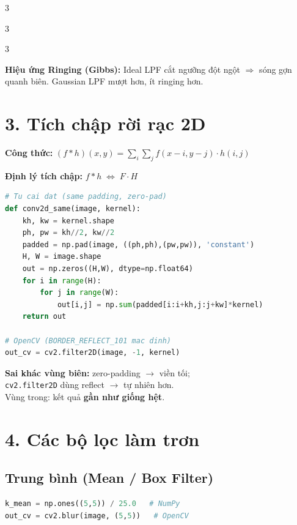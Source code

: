 \documentclass[9pt,landscape,a4paper]{extarticle}
\begin{document}
\begin{multicols*}{3}
\begin{multicols*}{3}
\begin{multicols}{3}
\begin{notebox}
\textbf{Hiệu ứng Ringing (Gibbs):} Ideal LPF cắt ngưỡng đột ngột
$\Rightarrow$ sóng gợn quanh biên. Gaussian LPF mượt hơn, ít ringing hơn.
\end{notebox}

\section{3. Tích chập rời rạc 2D}

\textbf{Công thức:}
$(f*h)(x,y) = \displaystyle\sum_{i}\sum_{j} f(x-i,y-j)\cdot h(i,j)$

\textbf{Định lý tích chập:}
$f*h \;\Longleftrightarrow\; F\cdot H$

\begin{lstlisting}[language=Python]
# Tu cai dat (same padding, zero-pad)
def conv2d_same(image, kernel):
    kh, kw = kernel.shape
    ph, pw = kh//2, kw//2
    padded = np.pad(image, ((ph,ph),(pw,pw)), 'constant')
    H, W = image.shape
    out = np.zeros((H,W), dtype=np.float64)
    for i in range(H):
        for j in range(W):
            out[i,j] = np.sum(padded[i:i+kh,j:j+kw]*kernel)
    return out

# OpenCV (BORDER_REFLECT_101 mac dinh)
out_cv = cv2.filter2D(image, -1, kernel)
\end{lstlisting}

\begin{notebox}
\textbf{Sai khác vùng biên:} zero-padding $\to$ viền tối;\\
\texttt{cv2.filter2D} dùng reflect $\to$ tự nhiên hơn.\\
Vùng trong: kết quả \textbf{gần như giống hệt}.
\end{notebox}

\section{4. Các bộ lọc làm trơn}

\subsection{Trung bình (Mean / Box Filter)}
\begin{lstlisting}[language=Python]
k_mean = np.ones((5,5)) / 25.0   # NumPy
out_cv = cv2.blur(image, (5,5))   # OpenCV
\end{lstlisting}


\end{multicols}
\end{multicols*}
\end{multicols*}
\end{document}
